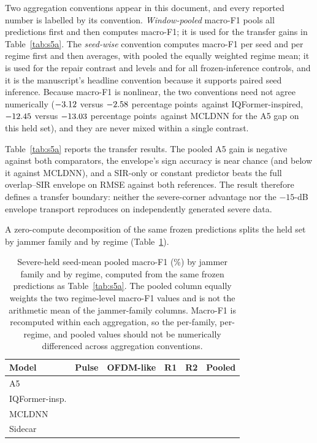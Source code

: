 \documentclass[letterpaper,onecolumn,11pt,journal]{IEEEtran}
\newcommand{\pp}{percentage points}
\begin{document}
Two aggregation conventions appear in this document, and every reported
number is labelled by its convention. \emph{Window-pooled} macro-F1 pools all
predictions first and then computes macro-F1; it is used for the transfer
gains in Table~\ref{tab:s5a}. The \emph{seed-wise} convention computes
macro-F1 per seed and per regime first and then averages, with pooled the
equally weighted regime mean; it is used for the repair contrast and levels
and for all frozen-inference controls, and it is the manuscript's headline
convention because it supports paired seed inference. Because macro-F1 is
nonlinear, the two conventions need not agree numerically
($-3.12$ versus $-2.58$ \pp\
against IQFormer-inspired, $-12.45$ versus
$-13.03$ \pp\ against MCLDNN for the A5 gap on this held
set), and they are never mixed within a single contrast.

Table~\ref{tab:s5a} reports the transfer results. The pooled
A5 gain is negative against both comparators, the envelope's sign accuracy
is near chance (and below it against MCLDNN), and a SIR-only or constant
predictor beats the full overlap--SIR envelope on RMSE against both
references. The result therefore defines a transfer boundary: neither the
severe-corner advantage nor the $-15$-dB envelope transport reproduces on
independently generated severe data.

A zero-compute decomposition of the same frozen predictions splits the held
set by jammer family and by regime (Table~\ref{tab:s5decomp}).

\begin{table}[t]
\centering
\caption{Severe-held seed-mean pooled macro-F1 (\%) by jammer family and by
regime, computed from the same frozen predictions as
Table~\ref{tab:s5a}. The pooled column equally weights the two regime-level
macro-F1 values and is not the arithmetic mean of the jammer-family columns.
Macro-F1 is recomputed within each aggregation, so the per-family,
per-regime, and pooled values should not be numerically differenced across
aggregation conventions.}
\label{tab:s5decomp}
\footnotesize
\setlength{\tabcolsep}{3pt}
\begin{tabular}{lccccc}
\toprule
Model & Pulse & OFDM-like & R1 & R2 & Pooled\\
\midrule
A5 & \SevereHeldFamilyPulseAFive & \SevereHeldFamilyOfdmAFive & \SevereHeldRegimeOneAFive & \SevereHeldRegimeTwoAFive & \SevereRepairLevelAFive\\
IQFormer-insp. & \SevereHeldFamilyPulseIqformer & \SevereHeldFamilyOfdmIqformer & \SevereHeldRegimeOneIqformer & \SevereHeldRegimeTwoIqformer & \SevereRepairLevelIqformer\\
MCLDNN & \SevereHeldFamilyPulseMcldnn & \SevereHeldFamilyOfdmMcldnn & \SevereHeldRegimeOneMcldnn & \SevereHeldRegimeTwoMcldnn & \SevereRepairLevelMcldnn\\
Sidecar & \SevereHeldFamilyPulseSidecar & \SevereHeldFamilyOfdmSidecar & \SevereHeldRegimeOneSidecar & \SevereHeldRegimeTwoSidecar & \SevereRepairLevelSidecar\\
\bottomrule
\end{tabular}
\end{table}
\end{document}
